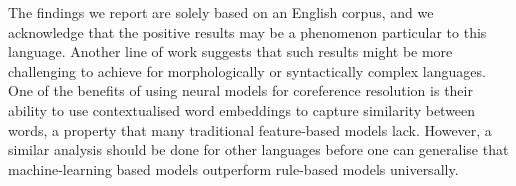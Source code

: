 \documentclass[11pt]{article}
\begin{document}

The findings we report are solely based on an English corpus, and we acknowledge that the positive results may be a phenomenon particular to this language. Another line of work \parencite{russian,other-lang} suggests that such results might be more challenging to achieve for morphologically or syntactically complex languages. One of the benefits of using neural models for coreference resolution is their ability to use contextualised word embeddings to capture similarity between words, a property that many traditional feature-based models lack. However, a similar analysis should be done for other languages before one can generalise that machine-learning based models outperform rule-based models universally.


\end{document}
